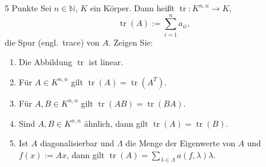 \documentclass{problemset}
\author{Michael van Straten}
\begin{document}
\maketitle

\begin{problem}{5 Punkte}
Sei $n \in \mathbb{N}$, $K$ ein Körper. Dann heißt $\operatorname{tr} : K^{n,n} \to K$,
\[ \operatorname{tr}(A) := \sum_{i=1}^{n} a_{ii}, \]
die Spur (engl.\ trace) von $A$. Zeigen Sie:
\begin{enumerate}
    \item Die Abbildung $\operatorname{tr}$ ist linear.
    \item Für $A \in K^{n,n}$ gilt $\operatorname{tr}(A) =
          \operatorname{tr}(A^T)$.
    \item Für $A, B \in K^{n,n}$ gilt $\operatorname{tr}(AB) =
          \operatorname{tr}(BA)$.
    \item Sind $A, B \in K^{n,n}$ ähnlich, dann gilt $\operatorname{tr}(A) =
          \operatorname{tr}(B)$.
    \item Ist $A$ diagonalisierbar und $\Lambda$ die Menge der Eigenwerte von
          $A$ und $f(x) := Ax$, dann gilt $\operatorname{tr}(A) = \sum_{\lambda
          \in \Lambda} a(f, \lambda)\lambda$.
\end{enumerate}
\end{problem}
\end{document}
